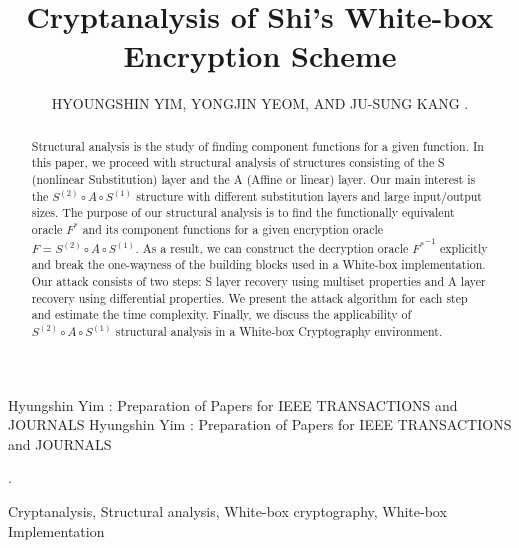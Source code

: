 \documentclass{ieeeaccess}
\begin{document}

\title{Cryptanalysis of Shi's White-box Encryption Scheme}
\author{\uppercase{Hyoungshin Yim},
\uppercase{Yongjin Yeom, and Ju-Sung Kang
}.
}
\address[1]{Department of Financial information security, 
Kookmin University, Seoul 02707, South Korea}
\address[2]{Department of Information Security, Cryptology, and Mathematics
Kookmin University, Seoul 02707, South Korea}


\markboth
{Hyungshin Yim \headeretal: Preparation of Papers for IEEE TRANSACTIONS and JOURNALS}
{Hyungshin Yim \headeretal: Preparation of Papers for IEEE TRANSACTIONS and JOURNALS}

.

\begin{abstract}
Structural analysis is the study of finding component functions for a given function.  
In this paper, we proceed with structural analysis of structures consisting of the S (nonlinear Substitution) layer and the A (Affine or linear) layer. 
Our main interest is the $S^{(2)}\circ A\circ S^{(1)}$ structure with different substitution layers and large input/output sizes. 
The purpose of our structural analysis is to find the functionally equivalent oracle $F^*$ 
and its component functions for a given encryption oracle $F=S^{(2)}\circ A\circ S^{(1)}$. 
As a result, we can construct the decryption oracle ${F^*}^{-1}$ explicitly and 
break the one-wayness of the building blocks used in a White-box implementation. 
Our attack consists of two steps: S layer recovery using multiset properties and A layer recovery using differential properties. 
We present the attack algorithm for each step and estimate the time complexity. 
Finally, we discuss the applicability of $S^{(2)}\circ A\circ S^{(1)}$ structural analysis in a White-box Cryptography environment.
\end{abstract}

\begin{keywords}
Cryptanalysis, Structural analysis, White-box cryptography, White-box Implementation
\end{keywords}
\end{document}
